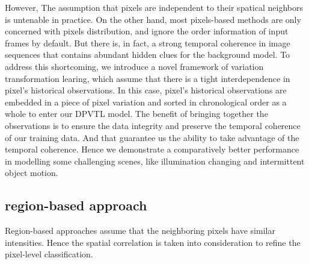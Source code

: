 \documentclass[journal]{IEEEtran}
\begin{document}
However, The assumption that pixels are independent to their spatical neighbors is untenable in practice. 
On the other hand, most pixels-based methods are only concerned with pixels distribution, and ignore the order information of input frames by default.
But there is, in fact, a strong temporal coherence in image sequences that contains abundant hidden clues for the background model. 
To address this shortcoming, we introduce a novel framework of variation transformation learing, which assume that there is a tight interdependence in pixel's historical observations.
In this case, pixel's historical observations are embedded in a piece of pixel variation and sorted in chronological order as a whole to enter our DPVTL model.
The benefit of bringing together the observations is to ensure the data integrity and preserve the temporal coherence of our training data. And that guarantee us the ability to take advantage of the temporal coherence. 
Hence we demonstrate a comparatively better performance in modelling some challenging scenes, like illumination changing and intermittent object motion.
%
%
%
%
%
%
\subsection{region-based approach}
Region-based approaches assume that the neighboring pixels have similar intensities. Hence the spatial correlation is taken into consideration to refine the pixel-level classification.
\end{document}
